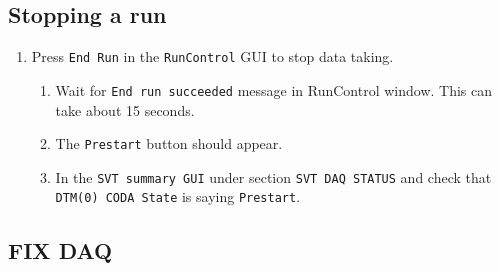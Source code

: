 \documentclass[12pt]{article}
\begin{document}
\subsection{Stopping a run}

\begin{enumerate}

\item
\label{item:stop}
Press \texttt{End Run} in the \texttt{RunControl}  GUI to stop data taking.

\begin{enumerate}
\item Wait for \texttt{End run succeeded} message in RunControl window. This can take about 15 seconds.
\item The \texttt{Prestart} button should appear.
\item In the \texttt{SVT summary GUI} under section \texttt{SVT DAQ STATUS} and check that \texttt{DTM(0) CODA State} is saying \texttt{Prestart}.
\end{enumerate}
\end{enumerate}

%
%
%
%
%
%


\newpage
\subsection{FIX DAQ}
\end{document}
